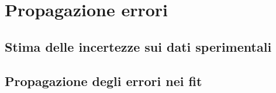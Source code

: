 \documentclass[@SRC@/main]{subfiles}
\begin{document}
\section{Propagazione errori}
\subsection{Stima delle incertezze sui dati sperimentali}
\label{subsec:propagazione-errori-misure}

\subsection{Propagazione degli errori nei fit}
\label{subsec:propagazione-errori-log}
\end{document}
